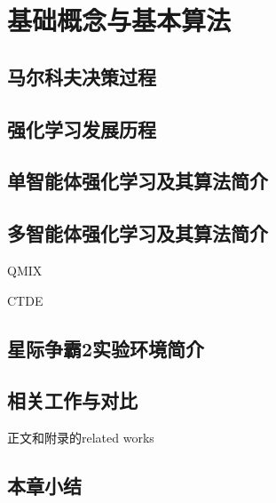 
\chapter{基础概念与基本算法}
\section{马尔科夫决策过程}

\section{强化学习发展历程}

\section{单智能体强化学习及其算法简介}

\section{多智能体强化学习及其算法简介}

QMIX

CTDE

\section{星际争霸2实验环境简介}

\section{相关工作与对比}
正文和附录的related works

\section{本章小结}

